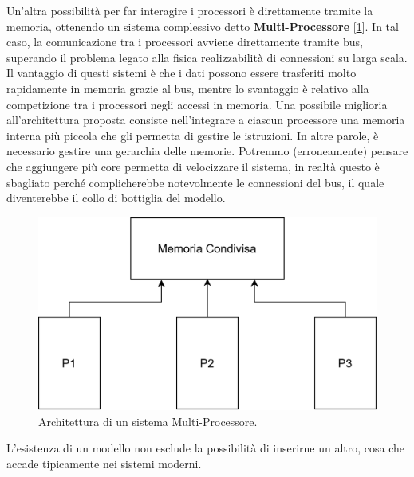Un'altra possibilità per far interagire i processori è direttamente tramite la memoria, ottenendo un sistema complessivo detto \textbf{Multi-Processore} [\ref{fig:multi-processore}]. In tal caso, la comunicazione tra i processori avviene direttamente tramite bus, superando il problema legato alla fisica realizzabilità di connessioni su larga scala. Il vantaggio di questi sistemi è che i dati possono essere trasferiti molto rapidamente in memoria grazie al bus, mentre lo svantaggio è relativo alla competizione tra i processori negli accessi in memoria. Una possibile miglioria all'architettura proposta consiste nell'integrare a ciascun processore una memoria interna più piccola che gli permetta di gestire le istruzioni. In altre parole, è necessario gestire una gerarchia delle memorie. 
Potremmo (erroneamente) pensare che aggiungere più core permetta di velocizzare il sistema, in realtà questo è sbagliato perché complicherebbe notevolmente le connessioni del bus, il quale diventerebbe il collo di bottiglia del modello.
\begin{figure}[!ht]
    \centering
    \includegraphics[width=0.5\linewidth]{img/multi-computer.png}
    \caption{Architettura di un sistema Multi-Processore.}
    \label{fig:multi-processore}
\end{figure}
L'esistenza di un modello non esclude la possibilità di inserirne un altro, cosa che accade tipicamente nei sistemi moderni.

